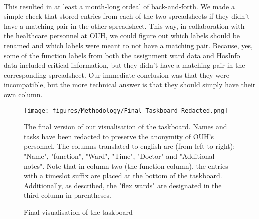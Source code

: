 \\
This resulted in at least a month-long ordeal of back-and-forth. We made a simple check that stored entries from each of the two spreadsheets if they didn't have a matching pair in the other spreadsheet. This way, in collaboration with the healthcare personnel at OUH, we could figure out which labels should be renamed and which labels were meant to not have a matching pair. Because, yes, some of the \gls{function} labels from both the assignment ward data and HosInfo data included critical information, but they didn't have a matching pair in the corresponding spreadsheet. Our immediate conclusion was that they were incompatible, but the more technical answer is that they should simply have their own column.

\begin{figure}[H]
    \centering
    \texttt{[image: figures/Methodology/Final-Taskboard-Redacted.png]}
    \caption{Final visualisation of the taskboard}
    \small
    \raggedright 
    The final version of our visualisation of the taskboard. Names and tasks have been redacted to preserve the anonymity of OUH's personnel. The columns translated to english are (from left to right): "Name", "\Gls{function}", "Ward", "Time", "Doctor" and "Additional notes". Note that in column two (the \Gls{function} column), the entries with a timeslot suffix are placed at the bottom of the taskboard. Additionally, as described, the "flex wards" are designated in the third column in parentheses.
    \label{fig:Final-Taskboard}
\end{figure}

